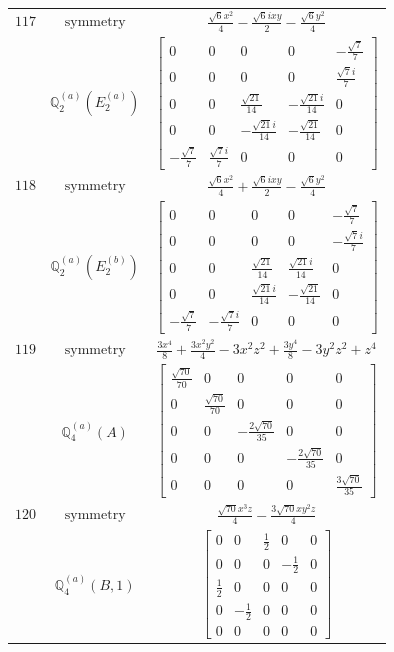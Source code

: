 \documentclass[fleqn,8pt,landscape]{jsarticle}
\begin{document}
\begin{longtable}{ccc}
$ 117 $ & $ \text{symmetry} $ & $ \frac{\sqrt{6} x^{2}}{4} - \frac{\sqrt{6} i x y}{2} - \frac{\sqrt{6} y^{2}}{4} $ \\
$  $ & $ \mathbb{Q}_{2}^{(a)}(E_{2}^{(a)}) $ & $ \begin{bmatrix} 0 & 0 & 0 & 0 & - \frac{\sqrt{7}}{7} \\ 0 & 0 & 0 & 0 & \frac{\sqrt{7} i}{7} \\ 0 & 0 & \frac{\sqrt{21}}{14} & - \frac{\sqrt{21} i}{14} & 0 \\ 0 & 0 & - \frac{\sqrt{21} i}{14} & - \frac{\sqrt{21}}{14} & 0 \\ - \frac{\sqrt{7}}{7} & \frac{\sqrt{7} i}{7} & 0 & 0 & 0 \end{bmatrix} $ \\ \hline
$ 118 $ & $ \text{symmetry} $ & $ \frac{\sqrt{6} x^{2}}{4} + \frac{\sqrt{6} i x y}{2} - \frac{\sqrt{6} y^{2}}{4} $ \\
$  $ & $ \mathbb{Q}_{2}^{(a)}(E_{2}^{(b)}) $ & $ \begin{bmatrix} 0 & 0 & 0 & 0 & - \frac{\sqrt{7}}{7} \\ 0 & 0 & 0 & 0 & - \frac{\sqrt{7} i}{7} \\ 0 & 0 & \frac{\sqrt{21}}{14} & \frac{\sqrt{21} i}{14} & 0 \\ 0 & 0 & \frac{\sqrt{21} i}{14} & - \frac{\sqrt{21}}{14} & 0 \\ - \frac{\sqrt{7}}{7} & - \frac{\sqrt{7} i}{7} & 0 & 0 & 0 \end{bmatrix} $ \\ \hline
$ 119 $ & $ \text{symmetry} $ & $ \frac{3 x^{4}}{8} + \frac{3 x^{2} y^{2}}{4} - 3 x^{2} z^{2} + \frac{3 y^{4}}{8} - 3 y^{2} z^{2} + z^{4} $ \\
$  $ & $ \mathbb{Q}_{4}^{(a)}(A) $ & $ \begin{bmatrix} \frac{\sqrt{70}}{70} & 0 & 0 & 0 & 0 \\ 0 & \frac{\sqrt{70}}{70} & 0 & 0 & 0 \\ 0 & 0 & - \frac{2 \sqrt{70}}{35} & 0 & 0 \\ 0 & 0 & 0 & - \frac{2 \sqrt{70}}{35} & 0 \\ 0 & 0 & 0 & 0 & \frac{3 \sqrt{70}}{35} \end{bmatrix} $ \\ \hline
$ 120 $ & $ \text{symmetry} $ & $ \frac{\sqrt{70} x^{3} z}{4} - \frac{3 \sqrt{70} x y^{2} z}{4} $ \\
$  $ & $ \mathbb{Q}_{4}^{(a)}(B,1) $ & $ \begin{bmatrix} 0 & 0 & \frac{1}{2} & 0 & 0 \\ 0 & 0 & 0 & - \frac{1}{2} & 0 \\ \frac{1}{2} & 0 & 0 & 0 & 0 \\ 0 & - \frac{1}{2} & 0 & 0 & 0 \\ 0 & 0 & 0 & 0 & 0 \end{bmatrix} $ \\ \hline

\end{longtable}
\end{document}
